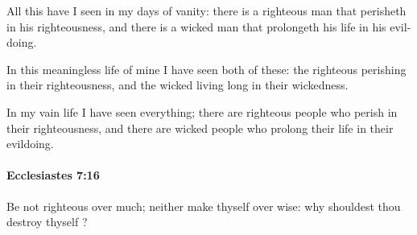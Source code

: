 			\begin{versebox}
					\item[BHS] 
					\item[LXX] 
					\item[ASV] All this have I seen in my days of vanity: there is a righteous man that perisheth in his righteousness, and there is a wicked man that prolongeth his life in his evil-doing.
					\item[NIV] In this meaningless life of mine I have seen both of these: the righteous perishing in their righteousness, and the wicked living long in their wickedness.
					\item[NRSV] In my vain life I have seen everything; there are righteous people who perish in their righteousness, and there are wicked people who prolong their life in their evildoing.
			\end{versebox}

		\paragraph{Ecclesiastes 7:16} %
			\label{ECCLESIASTES-7-16}

			Be not righteous over much; neither make thyself over wise: why shouldest thou destroy thyself ?


